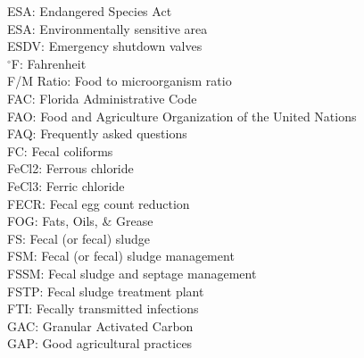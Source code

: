 ESA:  Endangered Species Act
\vspace{0.3cm}\\
ESA:  Environmentally sensitive area
\vspace{0.3cm}\\
ESDV:  Emergency shutdown valves
\vspace{0.3cm}\\
$^{\circ}$F:  Fahrenheit
\vspace{0.3cm}\\
F/M Ratio:  Food to microorganism ratio
\vspace{0.3cm}\\
FAC:  Florida Administrative Code
\vspace{0.3cm}\\
FAO:  Food and Agriculture Organization of the United Nations
\vspace{0.3cm}\\
FAQ:  Frequently asked questions
\vspace{0.3cm}\\
FC:  Fecal coliforms
\vspace{0.3cm}\\
FeCl2: Ferrous chloride
\vspace{0.3cm}\\
FeCl3:  Ferric chloride
\vspace{0.3cm}\\
FECR:  Fecal egg count reduction
\vspace{0.3cm}\\
FOG: Fats, Oils, \& Grease
\vspace{0.3cm}\\
FS:  Fecal (or fecal) sludge
\vspace{0.3cm}\\
FSM:  Fecal (or fecal) sludge management
\vspace{0.3cm}\\
FSSM:  Fecal sludge and septage management
\vspace{0.3cm}\\
FSTP:  Fecal sludge treatment plant
\vspace{0.3cm}\\
FTI:  Fecally transmitted infections
\vspace{0.3cm}\\
GAC:  Granular Activated Carbon
\vspace{0.3cm}\\
GAP:  Good agricultural practices
\vspace{0.3cm}\\
